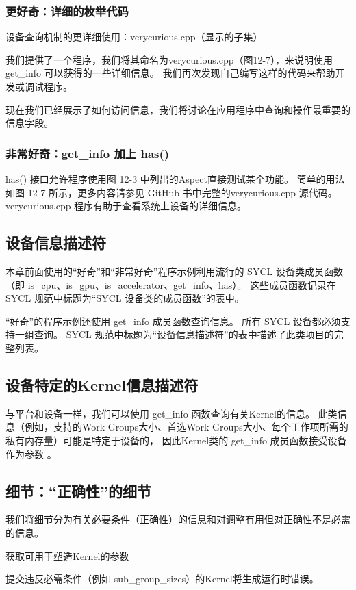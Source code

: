 \subsubsection{更好奇：详细的枚举代码}
{\color{red} 设备查询机制的更详细使用：verycurious.cpp（显示的子集）}

我们提供了一个程序，我们将其命名为verycurious.cpp（图12-7），来说明使用get\_info 可以获得的一些详细信息。 
我们再次发现自己编写这样的代码来帮助开发或调试程序。

现在我们已经展示了如何访问信息，我们将讨论在应用程序中查询和操作最重要的信息字段。

\subsubsection{非常好奇：get\_info 加上 has()}
has() 接口允许程序使用图 12-3 中列出的Aspect直接测试某个功能。 
简单的用法如图 12-7 所示，更多内容请参见 GitHub 书中完整的verycurious.cpp 源代码。
 verycurious.cpp 程序有助于查看系统上设备的详细信息。

\subsection{设备信息描述符}
本章前面使用的“好奇”和“非常好奇”程序示例利用流行的 SYCL 设备类成员函数
（即 is\_cpu、is\_gpu、is\_accelerator、get\_info、has）。 
这些成员函数记录在 SYCL 规范中标题为“SYCL 设备类的成员函数”的表中。

“好奇”的程序示例还使用 get\_info 成员函数查询信息。 所有 SYCL 设备都必须支持一组查询。 
SYCL 规范中标题为“设备信息描述符”的表中描述了此类项目的完整列表。

\subsection{设备特定的Kernel信息描述符}
与平台和设备一样，我们可以使用 get\_info 函数查询有关Kernel的信息。 
此类信息（例如，支持的Work-Groups大小、首选Work-Groups大小、每个工作项所需的私有内存量）可能是特定于设备的，
因此Kernel类的 get\_info 成员函数接受设备作为参数 。

\subsection{细节：“正确性”的细节}
我们将细节分为有关必要条件（正确性）的信息和对调整有用但对正确性不是必需的信息。

{\color{red} 获取可用于塑造Kernel的参数}

\begin{remark}
	提交违反必需条件（例如 sub\_group\_sizes）的Kernel将生成运行时错误。
\end{remark}

